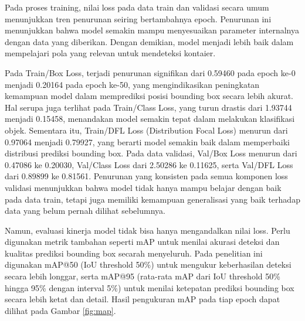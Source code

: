 Pada proses training, nilai loss pada data train dan validasi secara
umum menunjukkan tren penurunan seiring bertambahnya epoch. Penurunan
ini menunjukkan bahwa model semakin mampu menyesuaikan parameter
internalnya dengan data yang diberikan. Dengan demikian, model
menjadi lebih baik dalam mempelajari pola yang relevan untuk
mendeteksi kontaier.

Pada Train/Box Loss, terjadi penurunan signifikan dari 0.59460 pada
epoch ke-0 menjadi 0.20164 pada epoch ke-50, yang mengindikasikan
peningkatan kemampuan model dalam memprediksi posisi bounding box
secara lebih akurat. Hal serupa juga terlihat pada Train/Class Loss,
yang turun drastis dari 1.93744 menjadi 0.15458, menandakan model
semakin tepat dalam melakukan klasifikasi objek. Sementara itu,
Train/DFL Loss (Distribution Focal Loss) menurun dari 0.97064 menjadi
0.79927, yang berarti model semakin baik dalam memperbaiki distribusi
prediksi bounding box. Pada data validasi, Val/Box Loss menurun dari
0.47086 ke 0.20030, Val/Class Loss dari 2.50286 ke 0.11625, serta
Val/DFL Loss dari 0.89899 ke 0.81561. Penurunan yang konsisten pada
semua komponen loss validasi menunjukkan bahwa model tidak hanya
mampu belajar dengan baik pada data train, tetapi juga memiliki
kemampuan generalisasi yang baik terhadap data yang belum pernah
dilihat sebelumnya.

Namun, evaluasi kinerja model tidak bisa hanya mengandalkan nilai
loss. Perlu digunakan metrik tambahan seperti mAP  untuk menilai
akurasi deteksi dan kualitas prediksi bounding box secarah
menyeluruh. Pada penelitian ini digunakan mAP@50 (IoU threshold 50\%)
untuk mengukur keberhasilan deteksi secara lebih longgar, serta
mAP@95 (rata-rata mAP dari IoU threshold 50\% hingga 95\% dengan
interval 5\%) untuk menilai ketepatan prediksi bounding box secara
lebih ketat dan detail. Hasil pengukuran mAP pada tiap epoch dapat
dilihat pada Gambar \ref{fig:map}.


